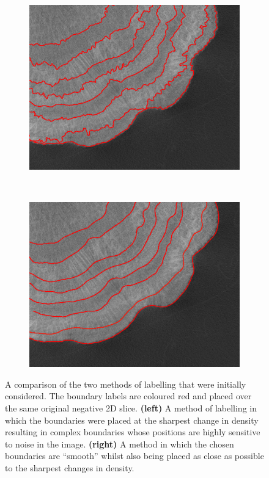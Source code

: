\begin{figure}[t]
    \centering
    \begin{subfigure}[t]{0.49\textwidth}
        \centering
        \includegraphics[width=1\textwidth, valign=c]{images/rough-label.png}
    \end{subfigure}
    ~
    \begin{subfigure}[t]{0.49\textwidth}
        \centering
        \includegraphics[width=1\textwidth, valign=c]{images/smooth-label.png}
    \end{subfigure}
    \caption{A comparison of the two methods of labelling that were initially considered. The boundary labels are coloured red and placed over the same original negative 2D slice. \textbf{(left)} A method of labelling in which the boundaries were placed at the sharpest change in density resulting in complex boundaries whose positions are highly sensitive to noise in the image. \textbf{(right)} A method in which the chosen boundaries are ``smooth'' whilst also being placed as close as possible to the sharpest changes in density.}
    \label{fig:labelstyle}
\end{figure}

